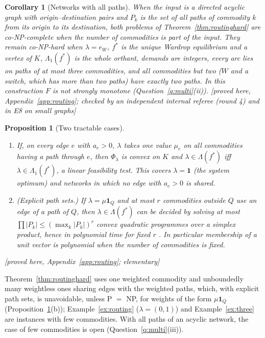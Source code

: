 \documentclass[11pt,a4paper]{article}
\theoremstyle{plain}
\newtheorem{proposition}[theorem]{Proposition}
\newtheorem{corollary}[theorem]{Corollary}
\theoremstyle{definition}
\theoremstyle{remark}
\newcommand{\status}[1]{\textsf{\small [#1]}}
\newcommand{\Lam}{\Lambda}
\newcommand{\Lone}{\Lambda_{1}}
\begin{document}
\begin{corollary}[Networks with all paths]\label{cor:routingdag}
When the input is a directed acyclic graph with origin--destination pairs and $P_k$ is the set of all paths of commodity $k$ from its origin to its destination, both problems of Theorem~\ref{thm:routinghard} are co-NP-complete when the number of commodities is part of the input. They remain co-NP-hard when $\lambda=e_W$, $f^*$ is the unique Wardrop equilibrium and a vertex of $K$, $\Lone(f^*)$ is the whole orthant, demands are integers, every arc lies on paths of at most three commodities, and all commodities but two ($W$ and a switch, which has more than two paths) have exactly two paths. In this construction $F$ is not strongly monotone (Question~\ref{q:multi}(ii)). \status{proved here, Appendix~\ref{app:routing}; checked by an independent internal referee (round 4) and in E8 on small graphs}
\end{corollary}

\begin{proposition}[Two tractable cases]\label{prop:routingeasy}
\begin{enumerate}[leftmargin=2em,label=(\alph*)]
\item If, on every edge $e$ with $a_e>0$, $\lambda$ takes one value $\mu_e$ on all commodities having a path through $e$, then $\Phi_\lambda$ is convex on $K$ and $\lambda\in\Lam(f^*)$ iff $\lambda\in\Lone(f^*)$, a linear feasibility test. This covers $\lambda=\mathbf 1$ (the system optimum) and networks in which no edge with $a_e>0$ is shared.
\item (Explicit path sets.) If $\lambda=\mu\mathbf 1_Q$ and at most $r$ commodities outside $Q$ use an edge of a path of $Q$, then $\lambda\in\Lam(f^*)$ can be decided by solving at most $\prod|P_k|\le(\max_k|P_k|)^r$ convex quadratic programmes over a simplex product, hence in polynomial time for fixed $r$ \citep{kozlovTarasovKhachiyan1980}. In particular membership of a unit vector is polynomial when the number of commodities is fixed.
\end{enumerate}
\status{proved here, Appendix~\ref{app:routing}; elementary}
\end{proposition}
Theorem~\ref{thm:routinghard} uses one weighted commodity and unboundedly many weightless ones sharing edges with the weighted paths, which, with explicit path sets, is unavoidable, unless P $=$ NP, for weights of the form $\mu\mathbf 1_Q$ (Proposition~\ref{prop:routingeasy}(b)); Example~\ref{ex:routing} ($\lambda=(0,1)$) and Example~\ref{ex:three} are instances with few commodities. With all paths of an acyclic network, the case of few commodities is open (Question~\ref{q:multi}(iii)).
\end{document}
